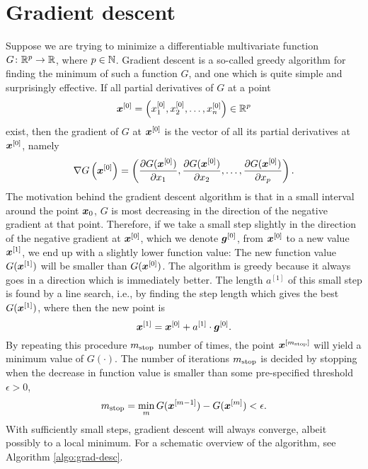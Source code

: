 \section{Gradient descent}
Suppose we are trying to minimize a differentiable multivariate function $G\colon\mathbb{R}^p\to\mathbb{R}$, where $p\in\mathbb{N}$.
Gradient descent is a so-called greedy algorithm for finding the minimum of such a function $G$, and one which is quite simple and surprisingly effective.
If all partial derivatives of $G$ at a point
\begin{equation*}
    \bm{x}^{[0]}=\left(x_1^{[0]},x_2^{[0]},\ldots,x_n^{[0]}\right)\in\mathbb{R}^p
\end{equation*}
exist, then the gradient of $G$ at $\bm{x}^{[0]}$ is the vector of all its partial derivatives at $\bm{x}^{[0]}$, namely
\begin{equation*}
    \nabla G\left(\bm{x}^{[0]}\right)=\left(\frac{\partial G(\bm{x}^{[0]})}{\partial x_1},\frac{\partial G(\bm{x}^{[0]})}{\partial x_2},\ldots,\frac{\partial G(\bm{x}^{[0]})}{\partial x_p}\right).
\end{equation*}
The motivation behind the gradient descent algorithm is that in a small interval around the point $\bm{x}_0$, $G$ is most decreasing in the direction of the negative gradient at that point.
Therefore, if we take a small step slightly in the direction of the negative gradient at $\bm{x}^{[0]}$, which we denote $\bm{g}^{[0]}$, from $\bm{x}^{[0]}$ to a new value $\bm{x}^{[1]}$, we end up with a slightly lower function value:
The new function value $G(\bm{x}^{[1]})$ will be smaller than $G(\bm{x}^{[0]})$.
The algorithm is greedy because it always goes in a direction which is immediately better.
The length $a^{[1]}$ of this small step is found by a line search, i.e., by finding the step length which gives the best $G(\bm{x}^{[1]})$, where then the new point is
\begin{equation*}
    \bm{x}^{[1]}=\bm{x}^{[0]}+a^{[1]}\cdot\boldsymbol{g}^{[0]}.
\end{equation*}
By repeating this procedure $m_{\text{stop}}$ number of times, the point $\bm{x}^{[m_{\text{stop}}]}$ will yield a minimum value of $G(\cdot)$.
The number of iterations $m_{\text{stop}}$ is decided by stopping when the decrease in function value is smaller than some pre-specified threshold $\epsilon>0$,
\begin{equation*}
    m_{\text{stop}}=\min_m G(\bm{x}^{[m-1]})-G(\bm{x}^{[m]})<\epsilon.
\end{equation*}
With sufficiently small steps, gradient descent will always converge, albeit possibly to a local minimum.
For a schematic overview of the algorithm, see Algorithm \ref{algo:grad-desc}.

